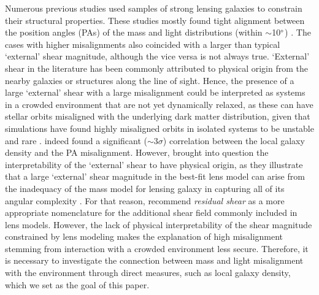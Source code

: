 \documentclass{aa}
\begin{document}
Numerous previous studies used samples of strong lensing galaxies to constrain their structural properties. These studies mostly found tight alignment between the position angles (PAs) of the mass and light distributions (within $\sim$10$^\circ$) \citep{Keeton98b, Kochanek02, Treu09, Gavazzi12, Sluse12, Bruderer16, Shajib19, Shajib21}. The cases with higher misalignments also coincided with a larger than typical `external' shear magnitude, although the vice versa is not always true. `External' shear in the literature has been commonly attributed to physical origin from the nearby galaxies or structures along the line of sight. Hence, the presence of a large `external' shear with a large misalignment could be interpreted as systems in a crowded environment that are not yet dynamically relaxed, as these can have stellar orbits misaligned with the underlying dark matter distribution, given that simulations have found highly misaligned orbits in isolated systems to be unstable and rare \citep{Heiligman79, Martinet88, Adams07, Debattista15}. \citet{Treu03} indeed found a significant ($\sim$3$\sigma$) correlation between the local galaxy density \citep{Dressler80, Cooper05} and the PA misalignment. However, \citet{Etherington23} brought into question the interpretability of the `external' shear to have physical origin, as they illustrate that a large `external' shear magnitude in the best-fit lens model can arise from the inadequacy of the mass model for lensing galaxy in capturing all of its angular complexity \citep[for example, boxy- or discy-ness, ellipticity gradient, isophotal twists;][]{VandeVyvere22, VandeVyvere22b}. For that reason, \citet{Shajib24} recommend \textit{residual shear} as a more appropriate nomenclature for the additional shear field commonly included in lens models. However, the lack of physical interpretability of the shear magnitude constrained by lens modeling makes the explanation of high misalignment stemming from interaction with a crowded environment less secure. Therefore, it is necessary to investigate the connection between mass and light misalignment with the environment through direct measures, such as local galaxy density, which we set as the goal of this paper.
\end{document}
